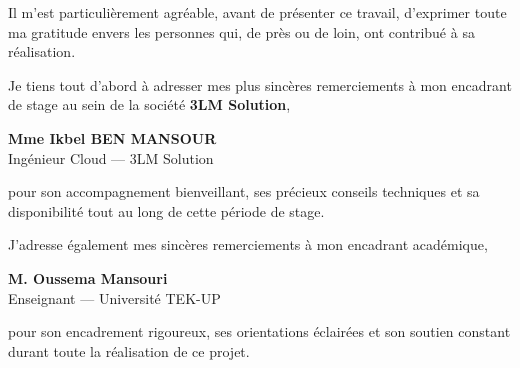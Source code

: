\begin{tcolorbox}[
    colback=white,
    colframe=tekupBlue,
    arc=5pt,
    boxrule=1.5pt,
    left=7mm, right=7mm,
    top=6mm, bottom=6mm
]

\justifying{}

Il m'est particulièrement agréable, avant de présenter ce travail, d'exprimer toute
ma gratitude envers les personnes qui, de près ou de loin, ont contribué à sa
réalisation.

\vspace{0.5em}

Je tiens tout d'abord à adresser mes plus sincères remerciements à mon encadrant
de stage au sein de la société \textbf{3LM Solution},

\vspace{0.3em}
\begin{center}
    \begin{tcolorbox}[
        colback=lightBlue,
        colframe=tekupBlue,
        boxrule=0.6pt,
        arc=4pt,
        width=0.72\linewidth,
        halign=center
    ]
        {\large\bfseries\color{tekupBlue} Mme Ikbel BEN MANSOUR}\\[3pt]
        {\small\color{gray} Ingénieur Cloud — 3LM Solution}
    \end{tcolorbox}
\end{center}
\vspace{0.3em}

pour son accompagnement bienveillant, ses précieux conseils techniques et sa
disponibilité tout au long de cette période de stage.

\vspace{0.5em}

J'adresse également mes sincères remerciements à mon encadrant académique,

\vspace{0.3em}
\begin{center}
    \begin{tcolorbox}[
        colback=lightBlue,
        colframe=tekupBlue,
        boxrule=0.6pt,
        arc=4pt,
        width=0.72\linewidth,
        halign=center
    ]
        {\large\bfseries\color{tekupBlue} M. Oussema Mansouri}\\[3pt]
        {\small\color{gray} Enseignant — Université TEK-UP}
    \end{tcolorbox}
\end{center}
\vspace{0.3em}

pour son encadrement rigoureux, ses orientations éclairées et son soutien constant
durant toute la réalisation de ce projet.


\end{tcolorbox}
